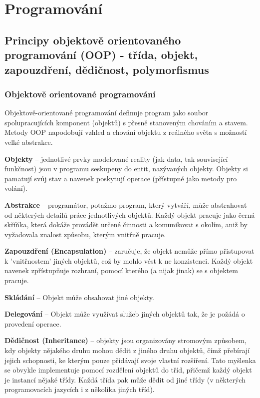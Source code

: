 \section{Programování}
\subsection[Principy objektově orientovaného programování]{Principy objektově orientovaného programování (OOP) - třída, objekt, zapouzdření, dědičnost, polymorfismus}
\subsubsection{Objektově orientované programování}
Objektově-orientované programování definuje program jako soubor spolupracujících komponent (objektů) s přesně stanoveným chováním a stavem. Metody OOP napodobují vzhled a 
chování objektu z reálného světa s možností velké abstrakce. 

\textbf{Objekty} -- jednotlivé prvky modelované reality (jak data, tak související funkčnost) jsou v programu seskupeny do entit, nazývaných objekty. Objekty si pamatují svůj stav a navenek poskytují operace (přístupné jako metody pro volání). 

\textbf{Abstrakce} -- programátor, potažmo program, který vytváří, může abstrahovat od některých detailů práce jednotlivých objektů. Každý objekt pracuje jako černá skříňka, která dokáže provádět určené činnosti a komunikovat s okolím, aniž by vyžadovala znalost způsobu, kterým vnitřně pracuje.

\textbf{Zapouzdření (Encapsulation)} -- zaručuje, že objekt nemůže přímo přistupovat k 'vnitřnostem' jiných objektů, což by mohlo vést k ne konzistenci. Každý objekt navenek zpřístupňuje rozhraní, pomocí kterého (a nijak jinak) se s objektem pracuje.

\textbf{Skládání} -- Objekt může obsahovat jiné objekty. 

\textbf{Delegování} -- Objekt může využívat služeb jiných objektů tak, že je požádá o provedení operace.

\textbf{Dědičnost (Inheritance)} – objekty jsou organizovány stromovým způsobem, kdy objekty nějakého druhu mohou dědit z jiného druhu objektů, čímž přebírají jejich schopnosti, ke kterým pouze přidávají svoje vlastní rozšíření. Tato myšlenka se obvykle implementuje pomocí rozdělení objektů do tříd, přičemž každý objekt je instancí nějaké třídy. Každá třída pak může dědit od jiné třídy (v některých programovacích jazycích i z několika jiných tříd).

